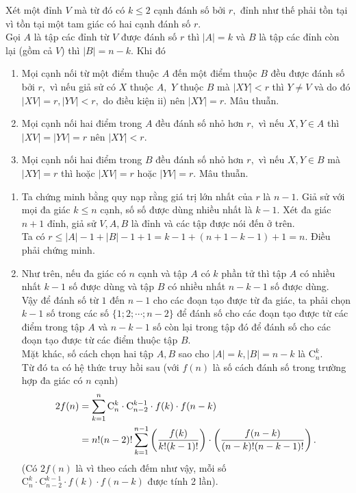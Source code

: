 \begin{bt}
{		
		Xét một đỉnh $V$ mà từ đó có $k\le 2$ cạnh đánh số bởi $r,$ đỉnh như thế phải tồn tại vì tồn tại một tam giác có hai cạnh đánh số $r.$\\ 
		Gọi $A$ là tập các đỉnh từ $V$ được đánh số $r$ thì $|A|=k$ và $B$ là tập các đỉnh còn lại (gồm cả $V$) thì $|B|=n-k.$ Khi đó
		\begin{enumerate}[\rm(i)]
			\item Mọi cạnh nối từ một điểm thuộc $A$ đến một điểm thuộc $B$ đều được đánh số bởi $r,$ vì nếu giả sử có $X$ thuộc $A,$ $Y$ thuộc $B$ mà $|XY|<r$ thì $Y\ne V$ và do đó $|XV|=r, |YV|<r,$ do điều kiện ii) nên $|XY|=r.$ Mâu thuẫn.
			\item Mọi cạnh nối hai điểm trong $A$ đều đánh số nhỏ hơn $r,$ vì nếu $X,Y\in A$ thì $|XV|=|YV|=r$ nên $|XY| < r.$
			\item Mọi cạnh nối hai điểm trong $B$ đều đánh số nhỏ hơn $r,$ vì nếu $X,Y\in B$ mà $|XY|=r$ thì hoặc $|XV|=r$ hoặc $|YV|=r.$ Mâu thuẫn.
		\end{enumerate}
		\begin{enumerate}
			\item Ta chứng minh bằng quy nạp rằng giá trị lớn nhất của $r$ là $n-1.$
			Giả sử với mọi đa giác $k\le n$ cạnh, số số được dùng nhiều nhất là $k-1.$
			Xét đa giác $n+1$ đỉnh, giả sử $V, A, B$ là đỉnh và các tập được nói đến ở trên.\\
			Ta có $r\le |A|-1+|B|-1+1=k-1+(n+1-k-1)+1=n.$ Điều phải chứng minh.
			\item Như trên, nếu đa giác có $n$ cạnh và tập $A$ có $k$ phần tử thì tập $A$ có nhiều nhất $k-1$ số được dùng và tập $B$ có nhiều nhất $n-k-1$ số được dùng.\\ 
			Vậy để đánh số từ $1$ đến $n-1$ cho các đoạn tạo được từ đa giác, ta phải chọn $k-1$ số trong các số $\{1;2;\cdots; n-2\}$ để đánh số cho các đoạn tạo được từ các điểm trong tập $A$ và $n-k-1$ số còn lại trong tập đó để đánh số cho các đoạn tạo được từ các điểm thuộc tập $B.$\\
			Mặt khác, số cách chọn hai tập $A, B$ sao cho $|A|=k, |B|=n-k$ là $\mathrm{C}_n^k.$\\
			Từ đó ta có hệ thức truy hồi sau (với $f(n)$ là số cách đánh số trong trường hợp đa giác có $n$ cạnh)			
			$$\aligned 2f(n) &=\sum\limits_{k = 1}^n \mathrm{C}_n^k\cdot \mathrm{C}_{n-2}^{k-1}\cdot f(k)\cdot f(n-k)\\
			&=n!(n-2)!\sum\limits_{k=1}^{n-1}\left(\dfrac{f(k)}{k!(k-1)!} \right)\cdot\left( \dfrac{f(n-k)}{(n-k)!(n-k-1)!}\right) . \endaligned$$
			(Có $2f(n)$ là vì theo cách đếm như vậy, mỗi số $\mathrm{C}_n^k\cdot \mathrm{C}_{n-2}^{k-1}\cdot f(k)\cdot f(n-k)$ được tính 2 lần).\\

\end{enumerate}}
\end{bt}
